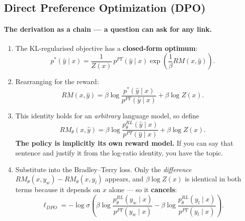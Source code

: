 \documentclass[11pt,a4paper]{article}
\begin{document}
\subsection{Direct Preference Optimization (DPO)}

\paragraph{The derivation as a chain --- a question can ask for any link.}
\begin{enumerate}[label=\arabic*.]
\item The KL-regularised objective has a \textbf{closed-form optimum}:
\[
p^{*}(\hat y\mid x)=\frac{1}{Z(x)}\,p^{PT}(\hat y\mid x)\exp\!\left(\frac{1}{\beta}RM(x,\hat y)\right).
\]
\item Rearranging for the reward:
\[
RM(x,\hat y)=\beta\log\frac{p^{*}(\hat y\mid x)}{p^{PT}(\hat y\mid x)}+\beta\log Z(x).
\]
\item This identity holds for an \emph{arbitrary} language model, so define
\[
RM_\theta(x,\hat y)=\beta\log\frac{p^{RL}_\theta(\hat y\mid x)}{p^{PT}(\hat y\mid x)}+\beta\log Z(x).
\]
\textbf{The policy is implicitly its own reward model.} If you can say that
sentence and justify it from the log-ratio identity, you have the topic.
\item Substitute into the Bradley--Terry loss. Only the \emph{difference}
$RM_\theta(x,y_w)-RM_\theta(x,y_l)$ appears, and $\beta\log Z(x)$ is identical
in both terms because it depends on $x$ alone --- so it \textbf{cancels}:
\[
\boxed{\;
\ell_{DPO}=-\log\sigma\!\left(\beta\log\frac{p^{RL}_\theta(y_w\mid x)}{p^{PT}(y_w\mid x)}
-\beta\log\frac{p^{RL}_\theta(y_l\mid x)}{p^{PT}(y_l\mid x)}\right).\;}
\]
\end{enumerate}
\end{document}
